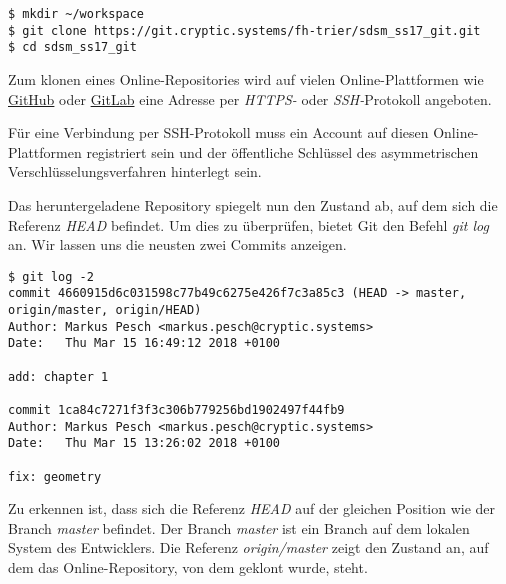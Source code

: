 \begin{verbatim}
$ mkdir ~/workspace
$ git clone https://git.cryptic.systems/fh-trier/sdsm_ss17_git.git
$ cd sdsm_ss17_git
\end{verbatim}

\begin{INFO}
  Zum klonen eines Online-Repositories wird auf vielen Online-Plattformen wie \href{https://github.com}{GitHub} oder \href{https://gitlab.com}{GitLab} eine Adresse per \textit{HTTPS-} oder \textit{SSH-}Protokoll angeboten. 
  
  Für eine Verbindung per SSH-Protokoll muss ein Account auf diesen Online-Plattformen registriert sein und der öffentliche Schlüssel des asymmetrischen Verschlüsselungsverfahren hinterlegt sein.  
\end{INFO}

Das heruntergeladene Repository spiegelt nun den Zustand ab, auf dem sich die Referenz \textit{HEAD} befindet. Um dies zu überprüfen, bietet Git den Befehl \textit{git log} an. Wir lassen uns die neusten zwei Commits anzeigen.

\begin{verbatim}
$ git log -2
commit 4660915d6c031598c77b49c6275e426f7c3a85c3 (HEAD -> master, 
origin/master, origin/HEAD)
Author: Markus Pesch <markus.pesch@cryptic.systems>
Date:   Thu Mar 15 16:49:12 2018 +0100

add: chapter 1

commit 1ca84c7271f3f3c306b779256bd1902497f44fb9
Author: Markus Pesch <markus.pesch@cryptic.systems>
Date:   Thu Mar 15 13:26:02 2018 +0100

fix: geometry
\end{verbatim}

Zu erkennen ist, dass sich die Referenz \textit{HEAD} auf der gleichen Position wie der Branch \textit{master} befindet. Der Branch \textit{master} ist ein Branch auf dem lokalen System des Entwicklers. Die Referenz \textit{origin/master} zeigt den Zustand an, auf dem das Online-Repository, von dem geklont wurde, steht.
